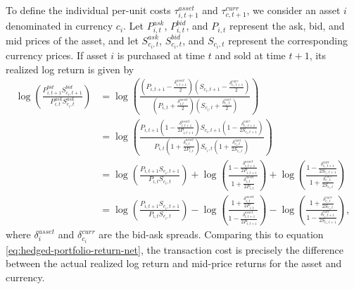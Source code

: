 To define the individual per-unit costs $\tau^{asset}_{i, t+1}$ and $\tau^{curr}_{c, t+1}$, we consider an asset $i$ denominated in currency $c_i$. Let $P^{ask}_{i,t}$, $P^{bid}_{i,t}$, and $P_{i,t}$ represent the ask, bid, and mid prices of the asset, and let $S^{ask}_{c_i,t}$, $S^{bid}_{c_i,t}$, and $S_{c_i,t}$ represent the corresponding currency prices. If asset $i$ is purchased at time $t$ and sold at time $t+1$, its realized log return is given by
\begin{align*}
\log \left( \frac{P^{bid}_{i,t+1}S^{bid}_{c_i,t+1}}{P^{ask}_{i,t} S^{ask}_{c_i,t}} \right) 
&= \log \left( \frac{ \left( P_{i,t+1} - \frac{\delta^{asset}_{i,t+1}}{2} \right) \left( S_{c_i,t+1} - \frac{\delta^{curr}_{c_i,t+1}}{2} \right) }{ \left( P_{i,t} + \frac{\delta^{asset}_{i,t}}{2} \right) \left( S_{c_i,t} + \frac{\delta^{curr}_{c_i,t}}{2} \right) } \right) \\
&= \log \left( \frac{ P_{i,t+1} \left( 1 - \frac{\delta^{asset}_{i,t+1}}{2P_{i,t+1}} \right) S_{c_i,t+1} \left( 1 - \frac{\delta^{curr}_{c_i,t+1}}{2S_{c_i,t+1}} \right) }{ P_{i,t} \left( 1 + \frac{\delta^{asset}_{i,t}}{2P_{i,t}} \right) S_{c_i,t} \left( 1 + \frac{\delta^{curr}_{c_i,t}}{2S_{c_i,t}} \right) } \right) \\
&= \log \left( \frac{P_{i,t+1}S_{c_i,t+1}}{P_{i,t}S_{c_i,t}} \right) + \log \left( \frac{ 1 - \frac{\delta^{asset}_{i,t+1}}{2P_{i,t+1}} }{ 1 + \frac{\delta^{asset}_{i,t}}{2P_{i,t}} } \right) + \log \left( \frac{ 1 - \frac{\delta^{curr}_{c_i,t+1}}{2S_{c_i,t+1}} }{ 1 + \frac{\delta^{curr}_{c_i,t}}{2S_{c_i,t}} } \right) \\
&= \log \left( \frac{P_{i,t+1}S_{c_i,t+1}}{P_{i,t}S_{c_i,t}} \right) - \log \left( \frac{1 + \frac{\delta^{asset}_{i,t}}{2P_{i,t}}}{1 - \frac{\delta^{asset}_{i,t+1}}{2P_{i,t+1}}} \right) - \log \left( \frac{1 + \frac{\delta^{curr}_{c_i,t}}{2S_{c_i,t}}}{1 - \frac{\delta^{curr}_{c_i,t+1}}{2S_{c_i,t+1}}} \right),
\end{align*}
where $\delta^{asset}_{i}$ and $\delta^{curr}_{c_i}$ are the bid-ask spreads. Comparing this to equation \eqref{eq:hedged-portfolio-return-net}, the transaction cost is precisely the difference between the actual realized log return and mid-price returns for the asset and currency. 

